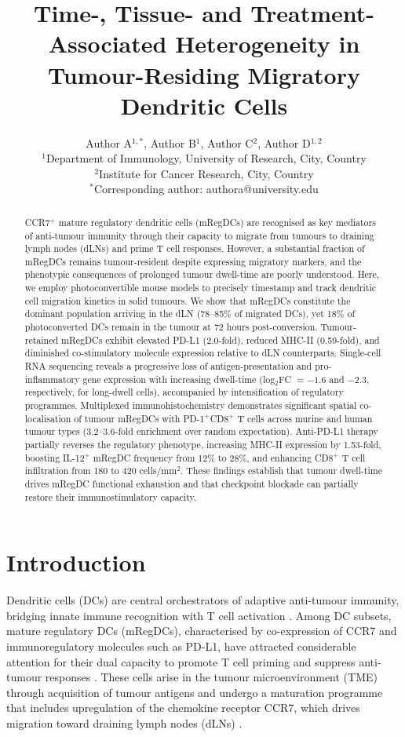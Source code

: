 \documentclass[11pt]{article}
\title{Time-, Tissue- and Treatment-Associated Heterogeneity in Tumour-Residing Migratory Dendritic Cells}
\author{%
  Author A$^{1,*}$, Author B$^{1}$, Author C$^{2}$, Author D$^{1,2}$ \\[6pt]
  $^{1}$Department of Immunology, University of Research, City, Country \\
  $^{2}$Institute for Cancer Research, City, Country \\
  $^{*}$Corresponding author: authora@university.edu
}
\date{}
\begin{document}
\maketitle

\begin{abstract}
CCR7$^{+}$ mature regulatory dendritic cells (mRegDCs) are recognised as key mediators of anti-tumour immunity through their capacity to migrate from tumours to draining lymph nodes (dLNs) and prime T cell responses. However, a substantial fraction of mRegDCs remains tumour-resident despite expressing migratory markers, and the phenotypic consequences of prolonged tumour dwell-time are poorly understood. Here, we employ photoconvertible mouse models to precisely timestamp and track dendritic cell migration kinetics in solid tumours. We show that mRegDCs constitute the dominant population arriving in the dLN (78--85\% of migrated DCs), yet 18\% of photoconverted DCs remain in the tumour at 72 hours post-conversion. Tumour-retained mRegDCs exhibit elevated PD-L1 (2.0-fold), reduced MHC-II (0.59-fold), and diminished co-stimulatory molecule expression relative to dLN counterparts. Single-cell RNA sequencing reveals a progressive loss of antigen-presentation and pro-inflammatory gene expression with increasing dwell-time (log$_2$FC $= -1.6$ and $-2.3$, respectively, for long-dwell cells), accompanied by intensification of regulatory programmes. Multiplexed immunohistochemistry demonstrates significant spatial co-localisation of tumour mRegDCs with PD-1$^{+}$CD8$^{+}$ T cells across murine and human tumour types (3.2--3.6-fold enrichment over random expectation). Anti-PD-L1 therapy partially reverses the regulatory phenotype, increasing MHC-II expression by 1.53-fold, boosting IL-12$^{+}$ mRegDC frequency from 12\% to 28\%, and enhancing CD8$^{+}$ T cell infiltration from 180 to 420 cells/mm$^{2}$. These findings establish that tumour dwell-time drives mRegDC functional exhaustion and that checkpoint blockade can partially restore their immunostimulatory capacity.
\end{abstract}

\section{Introduction}

Dendritic cells (DCs) are central orchestrators of adaptive anti-tumour immunity, bridging innate immune recognition with T cell activation \citep{steinman2007,mellman2011}. Among DC subsets, mature regulatory DCs (mRegDCs), characterised by co-expression of CCR7 and immunoregulatory molecules such as PD-L1, have attracted considerable attention for their dual capacity to promote T cell priming and suppress anti-tumour responses \citep{maier2020,gerhard2021}. These cells arise in the tumour microenvironment (TME) through acquisition of tumour antigens and undergo a maturation programme that includes upregulation of the chemokine receptor CCR7, which drives migration toward draining lymph nodes (dLNs) \citep{forster1999,sallusto1998}.
\end{document}
